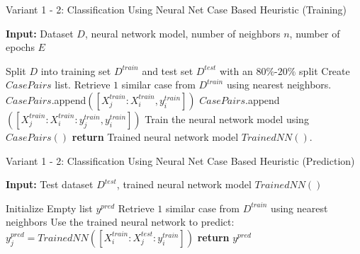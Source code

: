 \documentclass[a4paper, 12pt]{report}
\begin{document}
\begin{algorithm}
    \caption{Variant 1 - 2: Classification Using Neural Net Case Based Heuristic (Training)}
    \label{alg:Classification_Varient1_2_using_CBH_train_alg7}
    \textbf{Input:} Dataset $D$, neural network model, number of neighbors $n$, number of epochs $E$
    \begin{algorithmic}
        \State Split $D$ into training set $D^{train}$ and test set $D^{test}$ with an $80\%$-$20\%$ split
        \State Create $CasePairs$ list.
            \State Retrieve $1$ similar case from $D^{train}$ using nearest neighbors.
                    \State $CasePairs$.append$([X^{train}_j:X^{train}_i, y^{train}_i])$
                \Else
                        \State $CasePairs$.append$([X^{train}_j:X^{train}_i:y^{train}_j, y^{train}_i])$
                    \EndIf
                \EndIf
            \EndFor
        \EndFor
        \State Train the neural network model using $CasePairs()$
        \State \textbf{return} Trained neural network model $Trained NN()$.
    \end{algorithmic}
\end{algorithm}

\begin{algorithm}
    \caption{Variant 1 - 2: Classification Using Neural Net Case Based Heuristic (Prediction)}
    \label{alg:Classification_Varient1_2_using_CBH_predict_alg8}
    \textbf{Input:} Test dataset $D^{test}$, trained neural network model $Trained NN()$
    \begin{algorithmic}[1]
        \State Initialize Empty list $y^{pred}$
            \State Retrieve $1$ similar case from $D^{train}$ using nearest neighbors
                \State Use the trained neural network to predict: $y^{pred}_j = TrainedNN([X^{train}_i:X^{test}_j:y^{train}_i])$
            \EndFor
        \EndFor
        \State \textbf{return} $y^{pred}$
    \end{algorithmic}
\end{algorithm}
\end{document}
